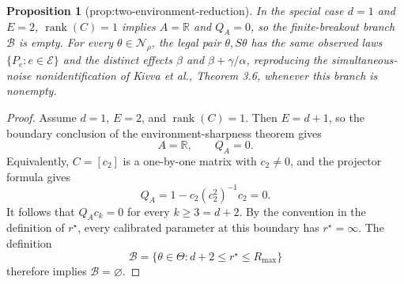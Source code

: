 \documentclass{article}
\newtheorem{proposition}{Proposition}
\begin{document}
\begin{proposition}[prop:two-environment-reduction]\label{prop:two-environment-reduction}
In the special case \(d=1\) and \(E=2\), \(\operatorname{rank}(C)=1\) implies \(A=\mathbb R\) and \(Q_A=0\), so the finite-breakout branch \(\mathcal B\) is empty.  For every \(\theta\in\mathcal N_\rho\), the legal pair \(\theta,S\theta\) has the same observed laws \(\{P_e:e\in\mathcal E\}\) and the distinct effects \(\beta\) and \(\beta+\gamma/\alpha\), reproducing the simultaneous-noise nonidentification of Kivva et al., Theorem 3.6, whenever this branch is nonempty.
\end{proposition}
\begin{proof}
Assume \(d=1\), \(E=2\), and \(\operatorname{rank}(C)=1\).  Then \(E=d+1\), so the boundary conclusion of the environment-sharpness theorem gives
\[
 A=\mathbb R,
 \qquad
 Q_A=0.
\]
Equivalently, \(C=[c_2]\) is a one-by-one matrix with \(c_2\neq0\), and the projector formula gives
\[
 Q_A
 =1-c_2(c_2^2)^{-1}c_2
 =0.
\]
It follows that \(Q_Ac_k=0\) for every \(k\geq3=d+2\).  By the convention in the definition of \(r^\star\), every calibrated parameter at this boundary has \(r^\star=\infty\).  The definition
\[
 \mathcal B=\{\theta\in\Theta:d+2\leq r^\star\leq R_{\max}\}
\]
therefore implies \(\mathcal B=\varnothing\).


\end{proof}
\end{document}
